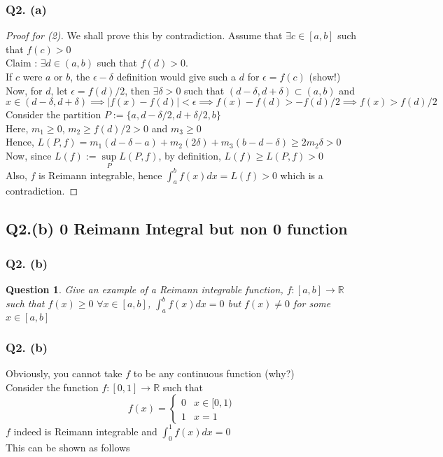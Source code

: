 \documentclass[aspectratio=169]{beamer}
\newtheorem{qsn}{Question}
\newcommand{\bR}{\mathbb{R}}
\begin{document}
\begin{frame}
\frametitle{Q2. (a)}
\begin{proof}[Proof for (2)]
\pause
We shall prove this by contradiction. Assume that $\exists c\in [a,b]$ such that $f(c)>0$\\ \pause
Claim : $\exists d\in(a,b)$ such that $f(d)>0$. \\ \pause
If $c$ were $a$ or $b$, the $\epsilon-\delta$ definition would give such a $d$ for $\epsilon = f(c)$ (show!) \\ \pause
Now, for $d$, let $\epsilon = f(d)/2$, then $\exists \delta>0$ such that $(d-\delta,d+\delta)\subset (a,b)$ and $x\in(d-\delta,d+\delta) \implies |f(x)-f(d)|<\epsilon \implies f(x)-f(d)>-f(d)/2 \implies f(x)>f(d)/2$ \\ \pause
Consider the partition $P:=\{a,d-\delta/2,d+\delta/2,b\}$ \\ \pause
Here, $m_1\geqslant 0$, $m_2\geqslant f(d)/2>0$ and $m_3 \geqslant 0$ \\ \pause
Hence, $L(P,f) = m_1(d-\delta-a)+m_2(2\delta) + m_3(b-d-\delta) \geqslant 2m_2\delta>0$ \\ \pause
Now, since $L(f) := \sup\limits_{P} L(P,f)$, by definition, $L(f)\geqslant L(P,f)>0$ \\ \pause
Also, $f$ is Reimann integrable, hence $\int_a^b f(x)dx = L(f) > 0$ which is a contradiction.
\end{proof}
\end{frame}

\subsection{Q2.(b) 0 Reimann Integral but non 0 function}

\begin{frame}
\frametitle{Q2. (b)}
\pause
\begin{qsn}
Give an example of a Reimann integrable function, $f:[a,b]\to\bR$ such that $f(x)\geqslant 0\,\, \forall x\in [a,b]$, $\int_a^b f(x)dx = 0$ but $f(x)\neq 0$ for some $x \in [a,b]$
\end{qsn}
\end{frame}

\begin{frame}
\frametitle{Q2. (b)}
\pause
Obviously, you cannot take $f$ to be any continuous function (why?) \\[1mm] \pause
Consider the function $f:[0,1]\to\bR$ such that
$$f(x) = 
\begin{cases}
0 & x\in [0,1)\\
1 & x=1
\end{cases}
$$\pause
$f$ indeed is Reimann integrable and $\int_0^1 f(x)dx=0$\\ \pause
This can be shown as follows
\end{frame}
\end{document}
